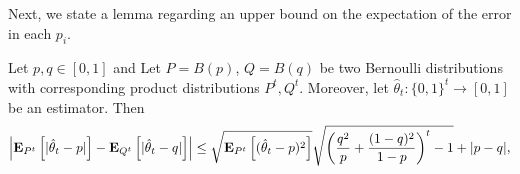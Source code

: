 Next, we state a lemma regarding an upper bound on the
expectation of the error in each $p_i$.

\begin{lemma}\label{l:cauchy_schwarz}
  Let $p, q \in [0,1]$ and Let $P = B(p)$, $Q = B(q)$ be two Bernoulli
  distributions with corresponding product distributions $P^t, Q^t$.
  Moreover, let $\hat{\theta}_t: \{0,1\}^t \to [0,1]$ be an estimator.
  Then
  \[
    \left|
    \bm{\mathrm{E}}_{P^t} \left[ |\hat{\theta}_t-p | \right]
    - \bm{\mathrm{E}}_{Q^t} \left[ |\hat{\theta}_t-q | \right]
    \right|
    \leq
    \sqrt{\bm{\mathrm{E}}_{P^t} \left[ (\hat{\theta}_t-p)^2 \right]}
    \sqrt{ \left( \frac{q^2}{p} + \frac{(1-q)^2}{1-p} \right)^t - 1}
    + |p - q|,
  \]
\end{lemma}
